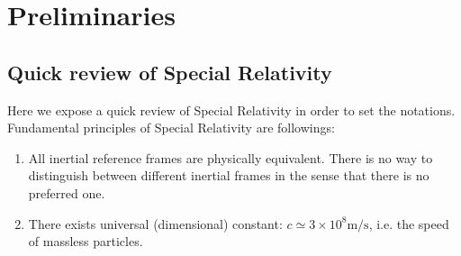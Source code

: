 \documentclass[../main/main.tex]{subfiles}
\begin{document}
\chapter{Preliminaries}
\section{Quick review of Special Relativity}

Here we expose a quick review of Special Relativity in order to set the notations.\\


Fundamental principles of Special Relativity are followings:
\begin{enumerate}
\item All inertial reference frames are physically equivalent. There is no way to distinguish between different inertial frames in the sense that there is no preferred one. 
\item There exists universal (dimensional) constant: $c\simeq3\times10^8\text{m/s}$, i.e. the speed of massless particles.
\end{enumerate}
\end{document}
